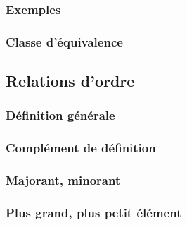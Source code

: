 \documentclass[12pt,a4paper,french]{book}
\begin{document}
			\subsubsection{Exemples}
			\subsubsection{Classe d'équivalence}
		\subsection{Relations d'ordre}
			\subsubsection{Définition générale}
			\subsubsection{Complément de définition}
			\subsubsection{Majorant, minorant}
			\subsubsection{Plus grand, plus petit élément}
		
\end{document}
